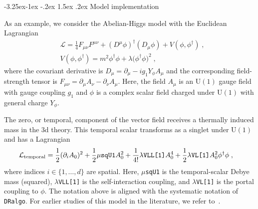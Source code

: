 \documentclass[11pt]{article}
\makeatletter
\def\dralgo{{\tt DRalgo}}
\renewcommand{\rmi}[1]{{\mbox{\scriptsize #1}}}
\renewcommand\subsection{\@startsection{subsection}{2}{\z@}%
  {-3.25ex\@plus -1ex \@minus -.2ex}%
  {1.5ex \@plus .2ex}%
  {\normalfont\normalsize\bfseries}}
\makeatother
\begin{document}
\subsection{Model implementation}

As an example, we consider
the Abelian-Higgs model with the Euclidean Lagrangian 
\begin{align}
\label{eq:L:ah}
&  \mathcal{L} =
     \frac{1}{4}F_{\mu \nu}F^{\mu \nu}
    + \left(D^\mu \phi\right)^\dagger\left(D_\mu\phi\right)
    + V(\phi,\phi^\dagger)
  \;, \\
&V(\phi,\phi^\dagger) =
      m^2 \phi^{\dagger}\phi
    + \lambda\bigl(\phi^\dagger\phi\bigr)^2
  \;,
\end{align}
where
the covariant derivative is
$D_\mu = \partial_\mu - i g_1 Y_\phi A_\mu$ and 
the corresponding field-strength tensor is 
$F_{\mu \nu} =\partial_\mu A_\nu-\partial_\nu A_\mu$.
Here, the field
$A_\mu$ is an $\mathrm{U}(1)$ gauge field with gauge coupling $g_1$ and
$\phi$ is a complex scalar field charged under $\mathrm{U}(1)$ with general charge $Y_\phi$.

The zero, or temporal, component of the vector field
receives a thermally induced mass in the 3d theory.
This temporal scalar transforms as a singlet under $\mathrm{U}(1)$ and has
a Lagrangian
\begin{align}
\mathcal{L}_{\rmi{temporal}} &=
    \frac{1}{2} (\partial_i A_0)^2
  + \frac{1}{2} {\tt \mu sqU1} A^2_0
  + \frac{1}{4!} \lambda\texttt{VLL[1]} A^4_0
  + \frac{1}{2} \lambda\texttt{VL[1]} A^2_0 \phi^\dagger \phi
  \;,
\end{align}
where indices $i\in \{1,\dots,d\}$ are spatial.
Here,
{\tt $\mu$sqU1} is the temporal-scalar Debye mass (squared),
{\tt $\lambda$VLL[1]} is the self-interaction coupling, and 
{\tt $\lambda$VL[1]} is the portal coupling to $\phi$.
The notation above is aligned with the systematic notation of \dralgo{}.
For earlier studies of this model in the literature, we refer to~\cite{%
  Andersen:1996dh,Andersen:1997ba,Kajantie:1997hn,Hirvonen:2021zej,Karjalainen:1996rk}.
\end{document}
